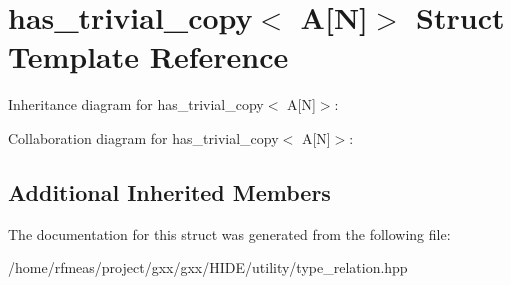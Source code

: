 \hypertarget{structhas__trivial__copy_3_01A[N]_4}{}\section{has\+\_\+trivial\+\_\+copy$<$ A\mbox{[}N\mbox{]}$>$ Struct Template Reference}
\label{structhas__trivial__copy_3_01A[N]_4}


Inheritance diagram for has\+\_\+trivial\+\_\+copy$<$ A\mbox{[}N\mbox{]}$>$\+:


Collaboration diagram for has\+\_\+trivial\+\_\+copy$<$ A\mbox{[}N\mbox{]}$>$\+:
\subsection*{Additional Inherited Members}


The documentation for this struct was generated from the following file\+:\begin{DoxyCompactItemize}
\item 
/home/rfmeas/project/gxx/gxx/\+H\+I\+D\+E/utility/type\+\_\+relation.\+hpp\end{DoxyCompactItemize}
